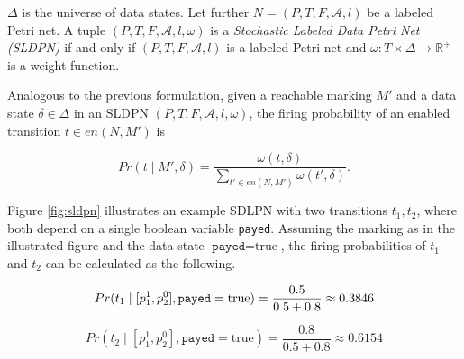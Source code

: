 \begin{definition}
    $\Delta$ is the universe of data states. Let further $N = (P, T, F, \mathcal{A}, l)$ be a labeled Petri net. A tuple $(P, T, F, \mathcal{A}, l, \omega)$ is a \emph{Stochastic Labeled Data Petri Net (SLDPN)} if and only if $(P, T, F, \mathcal{A}, l)$ is a labeled Petri net and $\omega: T \times \Delta \to \mathbb{R}^+$ is a weight function.
\end{definition}

Analogous to the previous formulation, given a reachable marking $M'$ and a data state $\delta \in \Delta$ in an SLDPN $(P, T, F, \mathcal{A}, l, \omega)$, the firing probability of an enabled transition $t \in en(N, M')$ is

\[
    Pr(t \mid M', \delta) = \frac{\omega(t, \delta)}{\sum_{t' \in en(N, M')} \omega(t', \delta)}.
\]

Figure \ref{fig:sldpn} illustrates an example SDLPN with two transitions $t_1, t_2$, where both depend on a single boolean variable \texttt{payed}. Assuming the marking as in the illustrated figure and the data state $\texttt{payed} = \text{true}$, the firing probabilities of $t_1$ and $t_2$ can be calculated as the following.

\[
    Pr(t_1 \mid [p_1^1, p_2^0], \texttt{payed} = \text{true}) = \frac{0.5}{0.5 + 0.8} \approx 0.3846
    \vspace{-0.5cm}
\]

\[
    Pr(t_2 \mid [p_1^1, p_2^0], \texttt{payed} = \text{true}) = \frac{0.8}{0.5 + 0.8} \approx 0.6154
\]

